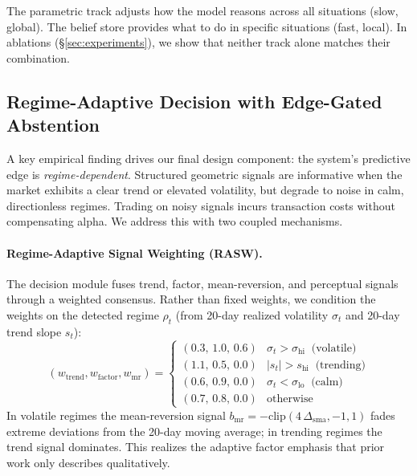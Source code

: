 The parametric track adjusts how the model reasons across all situations (slow, global). The belief store provides what to do in specific situations (fast, local). In ablations (\S\ref{sec:experiments}), we show that neither track alone matches their combination.

\subsection{Regime-Adaptive Decision with Edge-Gated Abstention}
\label{sec:rasw}

A key empirical finding drives our final design component: the system's predictive edge is \emph{regime-dependent}. Structured geometric signals are informative when the market exhibits a clear trend or elevated volatility, but degrade to noise in calm, directionless regimes. Trading on noisy signals incurs transaction costs without compensating alpha. We address this with two coupled mechanisms.

\paragraph{Regime-Adaptive Signal Weighting (RASW).} The decision module fuses trend, factor, mean-reversion, and perceptual signals through a weighted consensus. Rather than fixed weights, we condition the weights on the detected regime $\rho_t$ (from 20-day realized volatility $\sigma_t$ and 20-day trend slope $s_t$):
\begin{equation}
\label{eq:rasw}
(w_{\mathrm{trend}}, w_{\mathrm{factor}}, w_{\mathrm{mr}}) =
\begin{cases}
(0.3,\, 1.0,\, 0.6) & \sigma_t > \sigma_{\mathrm{hi}} \;\; \text{(volatile)} \\
(1.1,\, 0.5,\, 0.0) & |s_t| > s_{\mathrm{hi}} \;\; \text{(trending)} \\
(0.6,\, 0.9,\, 0.0) & \sigma_t < \sigma_{\mathrm{lo}} \;\; \text{(calm)} \\
(0.7,\, 0.8,\, 0.0) & \text{otherwise}
\end{cases}
\end{equation}
In volatile regimes the mean-reversion signal $b_{\mathrm{mr}} = -\mathrm{clip}(4\,\Delta_{\mathrm{sma}}, -1, 1)$ fades extreme deviations from the 20-day moving average; in trending regimes the trend signal dominates. This realizes the adaptive factor emphasis that prior work only describes qualitatively.

